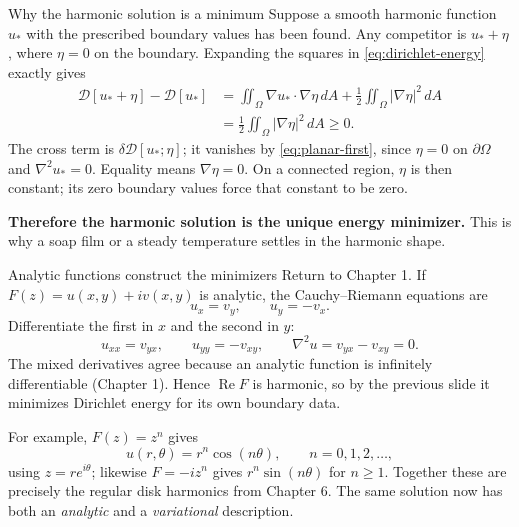 \documentclass[11pt]{beamer}
\newcommand{\dd}{\,d}
\newcommand{\D}{\mathcal D}
\begin{document}
\begin{frame}{Why the harmonic solution is a minimum}
\small
Suppose a smooth harmonic function $u_*$ with the prescribed boundary values has
been found. Any competitor is $u_*+\eta$, where $\eta=0$ on the boundary.
Expanding the squares in \eqref{eq:dirichlet-energy} exactly gives
\begin{align*}
 \D[u_*+\eta]-\D[u_*]
 &=\iint_\Omega\nabla u_*\cdot\nabla\eta\dd A
     +\frac12\iint_\Omega|\nabla\eta|^2\dd A\\
 &=\frac12\iint_\Omega|\nabla\eta|^2\dd A\ge0.
\end{align*}
The cross term is $\delta\D[u_*;\eta]$; it vanishes by \eqref{eq:planar-first},
since $\eta=0$ on $\partial\Omega$ and $\nabla^2 u_*=0$.
Equality means $\nabla\eta=0$. On a connected region, $\eta$ is then constant;
its zero boundary values force that constant to be zero.

\medskip
\textbf{Therefore the harmonic solution is the unique energy minimizer.}
This is why a soap film or a steady temperature settles in the harmonic shape.
\end{frame}

\begin{frame}{Analytic functions construct the minimizers}
\small
Return to Chapter 1. If $F(z)=u(x,y)+iv(x,y)$ is analytic, the Cauchy--Riemann
equations are
\[
 u_x=v_y,\qquad u_y=-v_x.
\]
Differentiate the first in $x$ and the second in $y$:
\[
 u_{xx}=v_{yx},\qquad u_{yy}=-v_{xy},\qquad
 \nabla^2 u=v_{yx}-v_{xy}=0.
\]
The mixed derivatives agree because an analytic function is infinitely differentiable (Chapter 1).
Hence $\operatorname{Re}F$ is harmonic, so by the previous slide it minimizes Dirichlet energy for its own boundary data.

\medskip
For example, $F(z)=z^n$ gives
\[
 u(r,\theta)=r^n\cos(n\theta),\qquad n=0,1,2,\ldots,
\]
using $z=re^{i\theta}$; likewise $F=-iz^n$ gives $r^n\sin(n\theta)$ for $n\ge1$.
Together these are precisely the regular disk harmonics from Chapter 6.
The same solution now has both an \emph{analytic} and a \emph{variational} description.
\end{frame}
\end{document}
